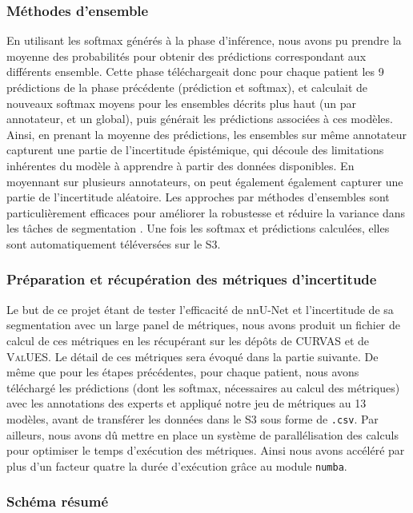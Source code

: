 \documentclass[a4paper,french,bookmarks,12pt]{article}
\begin{document}
    \subsubsection*{Méthodes d'ensemble}
    
    En utilisant les softmax générés à la phase d'inférence, nous avons pu prendre la moyenne des probabilités pour obtenir des prédictions correspondant aux différents ensemble. Cette phase téléchargeait donc pour chaque patient les 9 prédictions de la phase précédente (prédiction et softmax), et calculait de nouveaux softmax moyens pour les ensembles décrits plus haut (un par annotateur, et un global), puis générait les prédictions associées à ces modèles. Ainsi, en prenant la moyenne des prédictions, les ensembles sur même annotateur capturent une partie de l'incertitude épistémique, qui découle des limitations inhérentes du modèle à apprendre à partir des données disponibles. En moyennant sur plusieurs annotateurs, on peut également également capturer une partie de l'incertitude aléatoire. Les approches par méthodes d'ensembles sont particulièrement efficaces pour améliorer la robustesse et réduire la variance dans les tâches de segmentation \parencite{Ganaie_2022}. Une fois les softmax et prédictions calculées, elles sont automatiquement téléversées sur le S3.

    \subsubsection*{Préparation et récupération des métriques d'incertitude}

    Le but de ce projet étant de tester l'efficacité de nnU-Net et l'incertitude de sa segmentation avec un large panel de métriques, nous avons produit un fichier de calcul de ces métriques en les récupérant sur les dépôts de \textsc{CURVAS} et de \textsc{ValUES}. Le détail de ces métriques sera évoqué dans la partie suivante. De même que pour les étapes précédentes, pour chaque patient, nous avons téléchargé les prédictions (dont les softmax, nécessaires au calcul des métriques) avec les annotations des experts et appliqué notre jeu de métriques au 13 modèles, avant de transférer les données dans le S3 sous forme de \texttt{.csv}. Par ailleurs, nous avons dû mettre en place un système de parallélisation des calculs pour optimiser le temps d'exécution des métriques. Ainsi nous avons accéléré par plus d'un facteur quatre la durée d'exécution grâce au module \texttt{numba}.
    
    \subsubsection{Schéma résumé}
\end{document}
